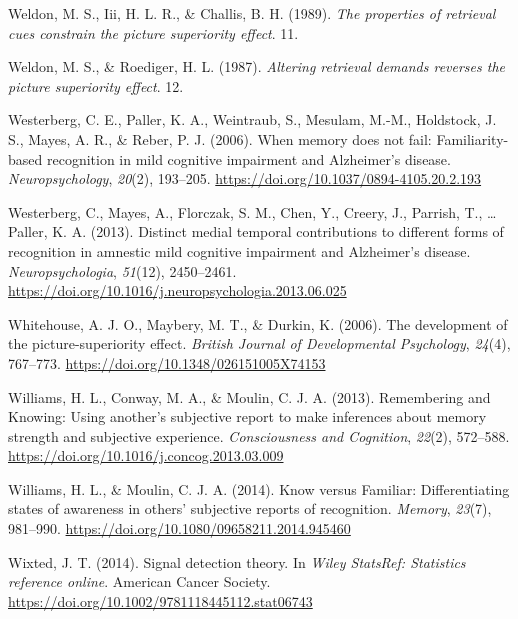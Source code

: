 \documentclass[
  11pt,
]{article}
\begin{document}
\leavevmode\hypertarget{ref-weldon1989}{}%
Weldon, M. S., Iii, H. L. R., \& Challis, B. H. (1989). \emph{The
properties of retrieval cues constrain the picture superiority effect}.
11.

\leavevmode\hypertarget{ref-weldon1987}{}%
Weldon, M. S., \& Roediger, H. L. (1987). \emph{Altering retrieval
demands reverses the picture superiority effect}. 12.

\leavevmode\hypertarget{ref-westerberg2006}{}%
Westerberg, C. E., Paller, K. A., Weintraub, S., Mesulam, M.-M.,
Holdstock, J. S., Mayes, A. R., \& Reber, P. J. (2006). When memory does
not fail: Familiarity-based recognition in mild cognitive impairment and
Alzheimer's disease. \emph{Neuropsychology}, \emph{20}(2), 193--205.
\url{https://doi.org/10.1037/0894-4105.20.2.193}

\leavevmode\hypertarget{ref-westerberg2013}{}%
Westerberg, C., Mayes, A., Florczak, S. M., Chen, Y., Creery, J.,
Parrish, T., \ldots{} Paller, K. A. (2013). Distinct medial temporal
contributions to different forms of recognition in amnestic mild
cognitive impairment and Alzheimer's disease. \emph{Neuropsychologia},
\emph{51}(12), 2450--2461.
\url{https://doi.org/10.1016/j.neuropsychologia.2013.06.025}

\leavevmode\hypertarget{ref-whitehouse2006}{}%
Whitehouse, A. J. O., Maybery, M. T., \& Durkin, K. (2006). The
development of the picture-superiority effect. \emph{British Journal of
Developmental Psychology}, \emph{24}(4), 767--773.
\url{https://doi.org/10.1348/026151005X74153}

\leavevmode\hypertarget{ref-williams2013}{}%
Williams, H. L., Conway, M. A., \& Moulin, C. J. A. (2013). Remembering
and Knowing: Using another's subjective report to make inferences about
memory strength and subjective experience. \emph{Consciousness and
Cognition}, \emph{22}(2), 572--588.
\url{https://doi.org/10.1016/j.concog.2013.03.009}

\leavevmode\hypertarget{ref-williams2014}{}%
Williams, H. L., \& Moulin, C. J. A. (2014). Know versus Familiar:
Differentiating states of awareness in others' subjective reports of
recognition. \emph{Memory}, \emph{23}(7), 981--990.
\url{https://doi.org/10.1080/09658211.2014.945460}

\leavevmode\hypertarget{ref-doi:https:ux2fux2fdoi.orgux2f10.1002ux2f9781118445112.stat06743}{}%
Wixted, J. T. (2014). Signal detection theory. In \emph{Wiley StatsRef:
Statistics reference online}. American Cancer Society.
\url{https://doi.org/10.1002/9781118445112.stat06743}
\end{document}
